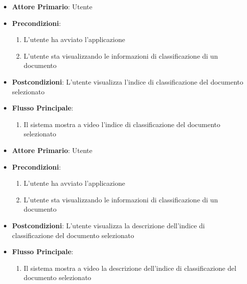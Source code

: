 \begin{itemize}
    \item \textbf{Attore Primario}: Utente
    \item \textbf{Precondizioni}:
    \begin{enumerate}
        \item L'utente ha avviato l'applicazione
        \item L'utente sta visualizzando le informazioni di classificazione di un documento
    \end{enumerate}
    \item \textbf{Postcondizioni}: L'utente visualizza l'indice di classificazione del documento selezionato
    \item \textbf{Flusso Principale}:
        \begin{enumerate}
            \item Il sistema mostra a video l'indice di classificazione del documento selezionato
        \end{enumerate}
\end{itemize}

\begin{itemize}
    \item \textbf{Attore Primario}: Utente
    \item \textbf{Precondizioni}:
    \begin{enumerate}
        \item L'utente ha avviato l'applicazione
        \item L'utente sta visualizzando le informazioni di classificazione di un documento
    \end{enumerate}
    \item \textbf{Postcondizioni}: L'utente visualizza la descrizione dell'indice di classificazione del documento selezionato
    \item \textbf{Flusso Principale}:
        \begin{enumerate}
            \item Il sistema mostra a video la descrizione dell'indice di classificazione del documento selezionato
        \end{enumerate}
\end{itemize}

